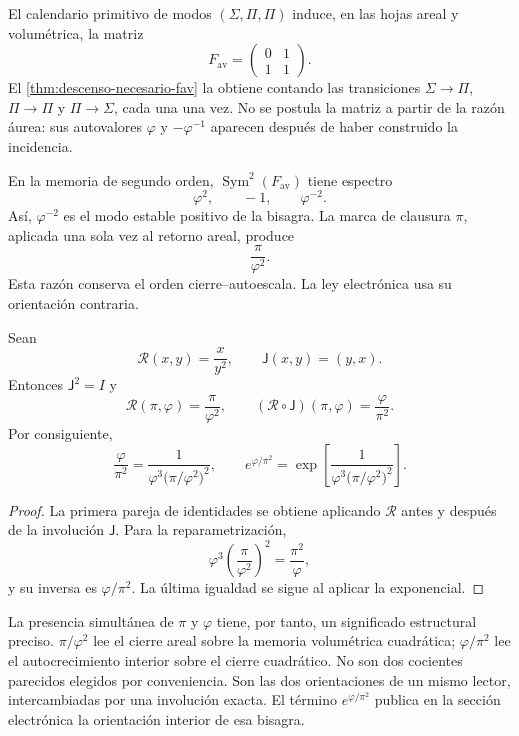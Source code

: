 El calendario primitivo de modos
\((\Sigma,\Pi,\Pi)\) induce, en las hojas areal y volumétrica, la matriz
\[
 F_{\mathrm{av}}
 =
 \begin{pmatrix}
 0&1\\
 1&1
 \end{pmatrix}.
\]
El \cref{thm:descenso-necesario-fav} la obtiene contando las transiciones
\(\Sigma\to\Pi\), \(\Pi\to\Pi\) y \(\Pi\to\Sigma\), cada una una vez.
No se postula la matriz a partir de la razón áurea: sus autovalores
\(\varphi\) y \(-\varphi^{-1}\) aparecen después de haber construido la
incidencia.

En la memoria de segundo orden,
\(\operatorname{Sym}^2(F_{\mathrm{av}})\) tiene espectro
\[
 \varphi^2,\qquad -1,\qquad\varphi^{-2}.
\]
Así, \(\varphi^{-2}\) es el modo estable positivo de la bisagra. La marca
de clausura \(\pi\), aplicada una sola vez al retorno areal, produce
\[
 \frac{\pi}{\varphi^2}.
\]
Esta razón conserva el orden cierre--autoescala. La ley electrónica usa su
orientación contraria.

\begin{theorem}
\label{thm:espejo-electron-rev6}
Sean
\[
 \mathscr R(x,y)=\frac{x}{y^2},
 \qquad
 \mathsf J(x,y)=(y,x).
\]
Entonces \(\mathsf J^2=I\) y
\[
 \mathscr R(\pi,\varphi)=\frac{\pi}{\varphi^2},
 \qquad
 (\mathscr R\circ\mathsf J)(\pi,\varphi)
 =\frac{\varphi}{\pi^2}.
\]
Por consiguiente,
\[
 \frac{\varphi}{\pi^2}
 =
 \frac{1}{
 \varphi^3\bigl(\pi/\varphi^2\bigr)^2},
 \qquad
 e^{\varphi/\pi^2}
 =
 \exp\!\left[
 \frac{1}{
 \varphi^3\bigl(\pi/\varphi^2\bigr)^2}
 \right].
\]
\end{theorem}

\begin{proof}
La primera pareja de identidades se obtiene aplicando
\(\mathscr R\) antes y después de la involución \(\mathsf J\). Para la
reparametrización,
\[
 \varphi^3
 \left(\frac{\pi}{\varphi^2}\right)^2
 =\frac{\pi^2}{\varphi},
\]
y su inversa es \(\varphi/\pi^2\). La última igualdad se sigue al aplicar
la exponencial.
\end{proof}

La presencia simultánea de \(\pi\) y \(\varphi\) tiene, por tanto, un
significado estructural preciso. \(\pi/\varphi^2\) lee el cierre areal
sobre la memoria volumétrica cuadrática; \(\varphi/\pi^2\) lee el
autocrecimiento interior sobre el cierre cuadrático. No son dos cocientes
parecidos elegidos por conveniencia. Son las dos orientaciones de un mismo
lector, intercambiadas por una involución exacta. El término
\(e^{\varphi/\pi^2}\) publica en la sección electrónica la orientación
interior de esa bisagra.

